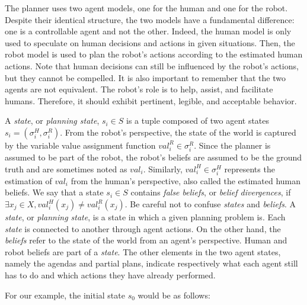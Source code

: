 The planner uses two agent models, one for the human and one for the robot. Despite their identical structure, the two models have a fundamental difference: one is a controllable agent and not the other. Indeed, the human model is only used to speculate on human decisions and actions in given situations. 
Then, the robot model is used to plan the robot's actions according to the estimated human actions.
Note that human decisions can still be influenced by the robot's actions, but they cannot be compelled.
It is also important to remember that the two agents are not equivalent. The robot's role is to help, assist, and facilitate humans. Therefore, it should exhibit pertinent, legible, and acceptable behavior.

 
A \textit{state}, or \textit{planning state}, $s_i \in S$ is a tuple composed of two agent states $s_i = ( \sigma^{H}_i, \sigma^{R}_i )$.
From the robot's perspective, the state of the world is captured by the variable value assignment function $val^R_i \in \sigma^{R}_i$. Since the planner is assumed to be part of the robot, the robot's beliefs are assumed to be the ground truth and are sometimes noted as $val_i$. 
Similarly, $val^H_i \in \sigma^{H}_i$ represents the estimation of $val_i$ from the human's perspective, also called the estimated human beliefs.
We say that a state $s_i \in S$ contains \textit{false beliefs}, or \textit{belief divergences}, if $\exists x_j \in X, val^H_i(x_j) \neq val^R_i(x_j)$. 
Be careful not to confuse \textit{states} and \textit{beliefs}. A \textit{state}, or \textit{planning state}, is a state in which a given planning problem is. Each \textit{state} is connected to another through agent actions. On the other hand, the \textit{beliefs} refer to the state of the world from an agent's perspective. Human and robot beliefs are part of a \textit{state}.
The other elements in the two agent states, namely the agendas and partial plans, indicate respectively what each agent still has to do and which actions they have already performed. 

For our example, the initial state $s_0$ would be as follows: 


